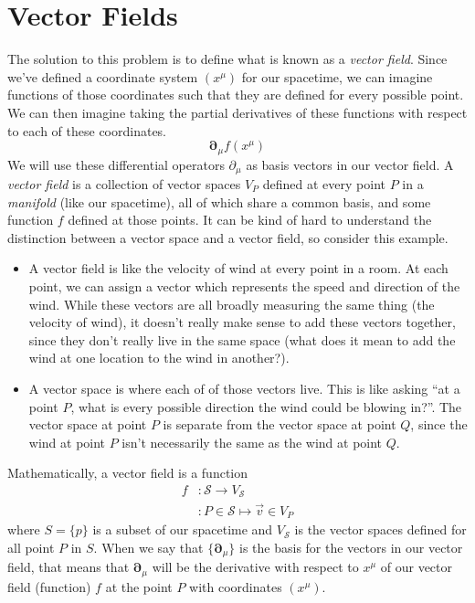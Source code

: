 \section{Vector Fields}
The solution to this problem is to define what is known as a \emph{vector field}.
Since we've defined a coordinate system $(x^\mu)$ for our spacetime, we can imagine functions of those coordinates such that they are defined for every possible point.
We can then imagine taking the partial derivatives of these functions with respect to each of these coordinates.
\[ \bm{\partial}_\mu f(x^\mu) \tag{defined for every $x^\mu$} \]
We will use these differential operators $\partial_\mu$ as basis vectors in our vector field.
A \emph{vector field} is a collection of vector spaces $V_P$ defined at every point $P$ in a \emph{manifold} (like our spacetime), all of which share a common basis, and some function $f$ defined at those points.
It can be kind of hard to understand the distinction between a vector space and a vector field, so consider this example.
\begin{itemize}
    \item A vector field is like the velocity of wind at every point in a room.
    At each point, we can assign a vector which represents the speed and direction of the wind.
    While these vectors are all broadly measuring the same thing (the velocity of wind), it doesn't really make sense to add these vectors together, since they don't really live in the same space (what does it mean to add the wind at one location to the wind in another?).
    \item A vector space is where each of of those vectors live.
    This is like asking ``at a point $P$, what is every possible direction the wind could be blowing in?''.
    The vector space at point $P$ is separate from the vector space at point $Q$, since the wind at point $P$ isn't necessarily the same as the wind at point $Q$.
\end{itemize}
Mathematically, a vector field is a function
\begin{align*}
    f &: \mathcal{S} \to V_\mathcal{S} \\
      &: P \in \mathcal{S} \mapsto \vec{v} \in V_P
\end{align*}
where $S = \{p\}$ is a subset of our spacetime and $V_\mathcal{S}$ is the vector spaces defined for all point $P$ in $S$.
When we say that $\{\bm{\partial}_\mu\}$ is the basis for the vectors in our vector field, that means that $\bm{\partial}_\mu$ will be the derivative with respect to $x^\mu$ of our vector field (function) $f$ at the point $P$ with coordinates $(x^\mu)$.
